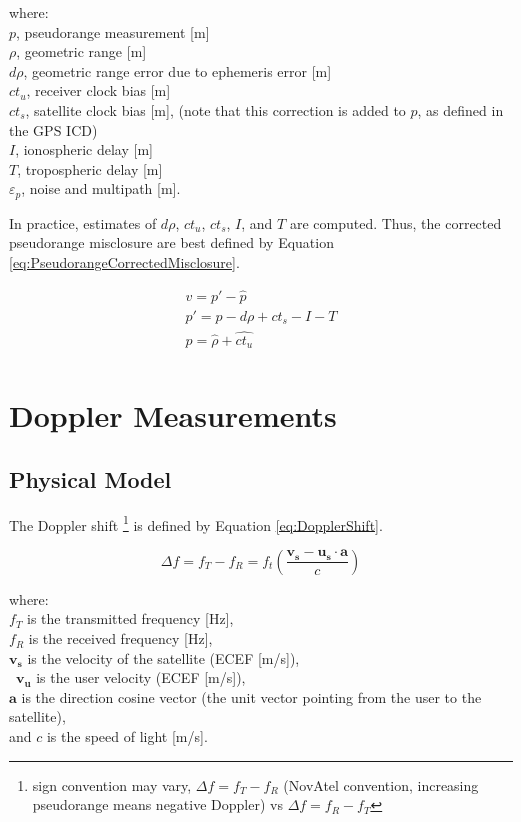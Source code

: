 \documentclass[11pt,letterpaper]{article}
\begin{document}
where: \\
$p$, pseudorange measurement [m] \\
$\rho$, geometric range [m] \\
$d\rho$, geometric range error due to ephemeris error [m] \\
$ct_u$, receiver clock bias [m] \\
$ct_s$, satellite clock bias [m], (note that this correction is added to $p$, as defined in the GPS ICD) \\
$I$, ionospheric delay [m] \\
$T$, tropospheric delay [m] \\
$\varepsilon_{p}$, noise and multipath [m].

In practice, estimates of $d\rho$, $ct_u$, $ct_s$, $I$, and $T$ are computed. Thus, the corrected pseudorange misclosure are best defined by Equation
\ref{eq:PseudorangeCorrectedMisclosure}.

\begin{equation} \label{eq:PseudorangeCorrectedMisclosure}
\begin{array}{l}
v = p' - \hat{p} \\
p' = p - d\rho + ct_s - I - T \\
\hat{p} = \hat{\rho} + \hat{ct_u} \\
\end{array}
\end{equation}

\pagebreak


\section{Doppler Measurements}

\subsection{Physical Model}

The Doppler shift \footnote{sign convention may vary, $\Delta f = f_T - f_R$ (NovAtel convention, increasing pseudorange means negative Doppler) vs $\Delta f= f_R - f_T$} is
defined by Equation \ref{eq:DopplerShift}.

\begin{equation} \label{eq:DopplerShift}
\Delta f = f_T - f_R = f_t (\frac{\mathbf{v_s-u_s}\cdot\mathbf{a}}{c})
\end{equation}

where: \\
$f_T$ is the transmitted frequency [Hz], \\
$f_R$ is the received frequency [Hz], \\
$\mathbf{v_s}$ is the velocity of the satellite (ECEF [m/s]), \\\
$\mathbf{v_u}$ is the user velocity (ECEF [m/s]), \\
$\mathbf{a}$ is the direction cosine vector (the unit vector pointing from the user to the satellite), \\
and $c$ is the speed of light [m/s].
\end{document}
